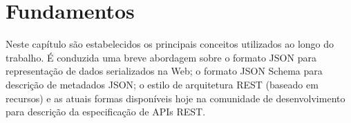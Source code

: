\chapter{Fundamentos}

Neste capítulo são estabelecidos os principais conceitos utilizados ao longo do trabalho. É conduzida uma breve abordagem sobre o formato JSON para representação de dados serializados na Web; o formato JSON Schema para descrição de metadados JSON; o estilo de arquitetura REST (baseado em recursos) e as atuais formas disponíveis hoje na comunidade de desenvolvimento para descrição da especificação de APIs REST.





